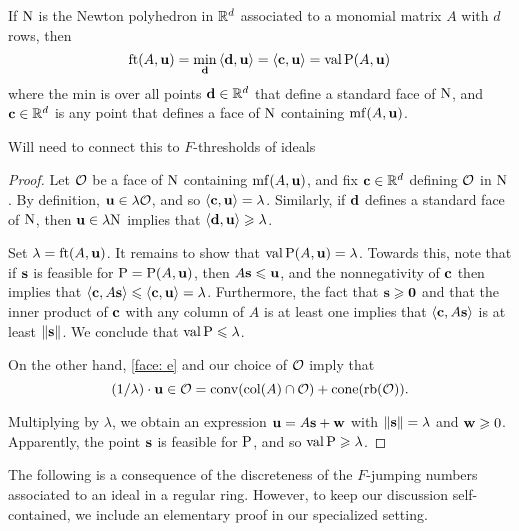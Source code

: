 \documentclass[11pt]{amsart}
\renewcommand{\!}[1]{{\color{red}\text{$\star$\,}#1\,$\star$}}
\begin{document}
\begin{proposition}
\label{FT descriptions: P}
  If $\mathrm{N}$ is the Newton polyhedron in $\mathbb{R}^d$ associated to a monomial matrix $A$ with $d$ rows, then
\[ \operatorname{ft}(A, \mathbf{u}) = \min_{\mathbf{d}} \, \langle \mathbf{d}, \mathbf{u} \rangle = \langle \mathbf{c}, \mathbf{u} \rangle = \operatorname{val} \mathrm{P}(A, \mathbf{u}) \] where the min is over all points $\mathbf{d} \in \mathbb{R}^d$ that define a standard face of $\mathrm{N}$, and $\mathbf{c} \in \mathbb{R}^d$ is any point that defines a face of $\mathrm{N}$ containing $\operatorname{mf}(A, \mathbf{u})$. 
\end{proposition}

\alert[inline]{Will need to connect this to $F$-thresholds of ideals}

\begin{proof} Let $\mathcal{O}$ be a face of $\mathrm{N}$ containing $\operatorname{mf}(A,\mathbf{u})$, and fix $\mathbf{c} \in \mathbb{R}^d$ defining $\mathcal{O}$ in $\mathrm{N}$.  By definition, $\mathbf{u} \in \lambda \mathcal{O}$, and so $\langle \mathbf{c}, \mathbf{u} \rangle = \lambda$.    Similarly, if $\mathbf{d}$ defines a standard face of $\mathrm{N}$, then $\mathbf{u} \in \lambda \mathrm{N}$ implies that $\langle \mathbf{d}, \mathbf{u} \rangle \geqslant \lambda$.

Set $\lambda = \operatorname{ft}(A, \mathbf{u})$.  It remains to show that $\operatorname{val} \mathrm{P}(A, \mathbf{u}) = \lambda$.  Towards this, note that if $\mathbf{s}$ is feasible for $\mathrm{P} = \mathrm{P}(A, \mathbf{u})$, then $A \mathbf{s} \leqslant \mathbf{u}$, and the nonnegativity of $\mathbf{c}$ then implies that  $\langle \mathbf{c}, A \mathbf{s} \rangle \leqslant \langle \mathbf{c}, \mathbf{u} \rangle = \lambda$.  Furthermore, the fact that $\mathbf{s} \geqslant \mathbf{0}$ and that the inner product of $\mathbf{c}$ with any column of $A$ is at least one implies that $\langle \mathbf{c}, A \mathbf{s} \rangle$ is at least $\| \mathbf{s} \|$.  We conclude that $\operatorname{val} \mathrm{P} \leqslant \lambda$.  

On the other hand, \eqref{face: e} and our choice of $\mathcal{O}$ imply that 
\begin{equation}
\label{cone containment: e}
 (1/\lambda) \cdot \mathbf{u} \in \mathcal{O} = \operatorname{conv}(\operatorname{col}(A) \cap \mathcal{O}) + \operatorname{cone}(\operatorname{rb}(\mathcal{O})).
\end{equation}

Multiplying by $\lambda$, we obtain an expression $\mathbf{u} = A \mathbf{s} + \mathbf{w}$ with $\| \mathbf{s} \| = \lambda$ and $\mathbf{w} \geqslant 0$.  Apparently, the point $\mathbf{s}$ is feasible for $\mathrm{P}$, and so $\operatorname{val} \mathrm{P} \geqslant \lambda$.
\end{proof}


The following is a consequence of the discreteness of the $F$-jumping numbers associated to an ideal in a regular ring.  However, to keep our discussion self-contained, we include an elementary proof in our specialized setting.
\end{document}
